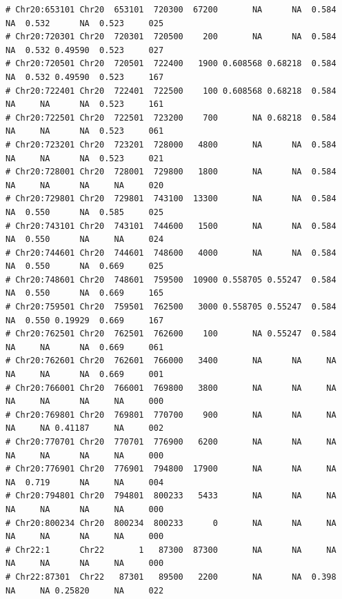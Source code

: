 \documentclass{article}\usepackage[]{graphicx}\usepackage[]{color}
\makeatletter
\newenvironment{kframe}{%
 \def\at@end@of@kframe{}%
 \ifinner\ifhmode%
  \def\at@end@of@kframe{\end{minipage}}%
  \begin{minipage}{\columnwidth}%
 \fi\fi%
 \def\FrameCommand##1{\hskip\@totalleftmargin \hskip-\fboxsep
 \colorbox{shadecolor}{##1}\hskip-\fboxsep
     \hskip-\linewidth \hskip-\@totalleftmargin \hskip\columnwidth}%
 \MakeFramed {\advance\hsize-\width
   \@totalleftmargin\z@ \linewidth\hsize
   \@setminipage}}%
 {\par\unskip\endMakeFramed%
 \at@end@of@kframe}
\newenvironment{knitrout}{}{} %
\makeatother
\begin{document}
\begin{knitrout}
\begin{kframe}
\begin{verbatim}
# Chr20:653101 Chr20  653101  720300  67200       NA      NA  0.584      NA  0.532      NA  0.523     025
# Chr20:720301 Chr20  720301  720500    200       NA      NA  0.584      NA  0.532 0.49590  0.523     027
# Chr20:720501 Chr20  720501  722400   1900 0.608568 0.68218  0.584      NA  0.532 0.49590  0.523     167
# Chr20:722401 Chr20  722401  722500    100 0.608568 0.68218  0.584      NA     NA      NA  0.523     161
# Chr20:722501 Chr20  722501  723200    700       NA 0.68218  0.584      NA     NA      NA  0.523     061
# Chr20:723201 Chr20  723201  728000   4800       NA      NA  0.584      NA     NA      NA  0.523     021
# Chr20:728001 Chr20  728001  729800   1800       NA      NA  0.584      NA     NA      NA     NA     020
# Chr20:729801 Chr20  729801  743100  13300       NA      NA  0.584      NA  0.550      NA  0.585     025
# Chr20:743101 Chr20  743101  744600   1500       NA      NA  0.584      NA  0.550      NA     NA     024
# Chr20:744601 Chr20  744601  748600   4000       NA      NA  0.584      NA  0.550      NA  0.669     025
# Chr20:748601 Chr20  748601  759500  10900 0.558705 0.55247  0.584      NA  0.550      NA  0.669     165
# Chr20:759501 Chr20  759501  762500   3000 0.558705 0.55247  0.584      NA  0.550 0.19929  0.669     167
# Chr20:762501 Chr20  762501  762600    100       NA 0.55247  0.584      NA     NA      NA  0.669     061
# Chr20:762601 Chr20  762601  766000   3400       NA      NA     NA      NA     NA      NA  0.669     001
# Chr20:766001 Chr20  766001  769800   3800       NA      NA     NA      NA     NA      NA     NA     000
# Chr20:769801 Chr20  769801  770700    900       NA      NA     NA      NA     NA 0.41187     NA     002
# Chr20:770701 Chr20  770701  776900   6200       NA      NA     NA      NA     NA      NA     NA     000
# Chr20:776901 Chr20  776901  794800  17900       NA      NA     NA      NA  0.719      NA     NA     004
# Chr20:794801 Chr20  794801  800233   5433       NA      NA     NA      NA     NA      NA     NA     000
# Chr20:800234 Chr20  800234  800233      0       NA      NA     NA      NA     NA      NA     NA     000
# Chr22:1      Chr22       1   87300  87300       NA      NA     NA      NA     NA      NA     NA     000
# Chr22:87301  Chr22   87301   89500   2200       NA      NA  0.398      NA     NA 0.25820     NA     022
\end{verbatim}
\end{kframe}


\end{knitrout}
\end{document}
